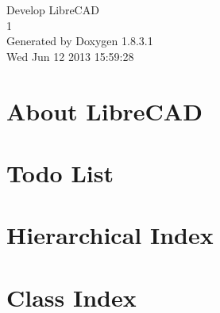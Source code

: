\documentclass{book}
\begin{document}
\hypersetup{pageanchor=false,citecolor=blue}
\begin{titlepage}
\vspace*{7cm}
\begin{center}
{\Large Develop Libre\-C\-A\-D \\[1ex]\large 1 }\\
\vspace*{1cm}
{\large Generated by Doxygen 1.8.3.1}\\
\vspace*{0.5cm}
{\small Wed Jun 12 2013 15:59:28}\\
\end{center}
\end{titlepage}
\clearemptydoublepage
{}
\tableofcontents
\clearemptydoublepage
{}
\hypersetup{pageanchor=true,citecolor=blue}
\chapter{About Libre\-C\-A\-D}
\label{md_README}
\hypertarget{md_README}{}

\chapter{Todo List}
\label{todo}
\hypertarget{todo}{}

\chapter{Hierarchical Index}

\chapter{Class Index}

\end{document}
